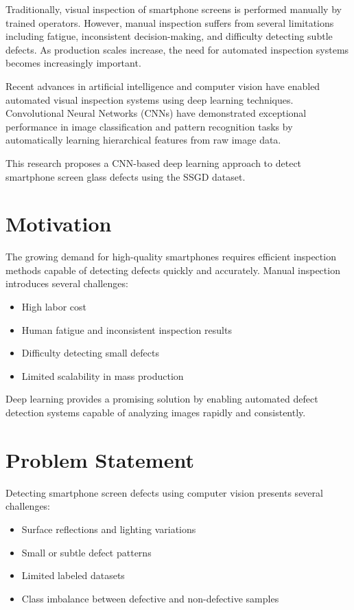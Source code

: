 \documentclass[conference]{IEEEtran}
\begin{document}
Traditionally, visual inspection of smartphone screens is performed manually by trained operators. However, manual inspection suffers from several limitations including fatigue, inconsistent decision-making, and difficulty detecting subtle defects. As production scales increase, the need for automated inspection systems becomes increasingly important.

Recent advances in artificial intelligence and computer vision have enabled automated visual inspection systems using deep learning techniques. Convolutional Neural Networks (CNNs) have demonstrated exceptional performance in image classification and pattern recognition tasks by automatically learning hierarchical features from raw image data.

This research proposes a CNN-based deep learning approach to detect smartphone screen glass defects using the SSGD dataset.

\section{Motivation}

The growing demand for high-quality smartphones requires efficient inspection methods capable of detecting defects quickly and accurately. Manual inspection introduces several challenges:

\begin{itemize}
\item High labor cost
\item Human fatigue and inconsistent inspection results
\item Difficulty detecting small defects
\item Limited scalability in mass production
\end{itemize}

Deep learning provides a promising solution by enabling automated defect detection systems capable of analyzing images rapidly and consistently.

\section{Problem Statement}

Detecting smartphone screen defects using computer vision presents several challenges:

\begin{itemize}
\item Surface reflections and lighting variations
\item Small or subtle defect patterns
\item Limited labeled datasets
\item Class imbalance between defective and non-defective samples
\end{itemize}
\end{document}
